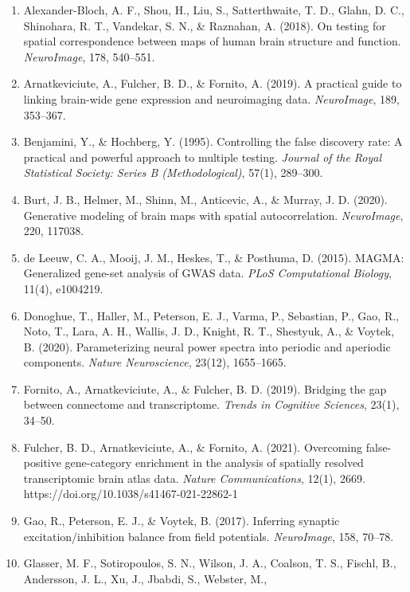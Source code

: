 \documentclass[
  11pt,
  letterpaper,
]{article}
\providecommand{\tightlist}{%
  \setlength{\itemsep}{0pt}\setlength{\parskip}{0pt}}
\begin{document}
\begin{enumerate}
\def\labelenumi{\arabic{enumi}.}
\tightlist
\item
  Alexander-Bloch, A. F., Shou, H., Liu, S., Satterthwaite, T. D.,
  Glahn, D. C., Shinohara, R. T., Vandekar, S. N., \& Raznahan, A.
  (2018). On testing for spatial correspondence between maps of human
  brain structure and function. \emph{NeuroImage}, 178, 540--551.
\item
  Arnatkeviciute, A., Fulcher, B. D., \& Fornito, A. (2019). A practical
  guide to linking brain-wide gene expression and neuroimaging data.
  \emph{NeuroImage}, 189, 353--367.
\item
  Benjamini, Y., \& Hochberg, Y. (1995). Controlling the false discovery
  rate: A practical and powerful approach to multiple testing.
  \emph{Journal of the Royal Statistical Society: Series B
  (Methodological)}, 57(1), 289--300.
\item
  Burt, J. B., Helmer, M., Shinn, M., Anticevic, A., \& Murray, J. D.
  (2020). Generative modeling of brain maps with spatial
  autocorrelation. \emph{NeuroImage}, 220, 117038.
\item
  de Leeuw, C. A., Mooij, J. M., Heskes, T., \& Posthuma, D. (2015).
  MAGMA: Generalized gene-set analysis of GWAS data. \emph{PLoS
  Computational Biology}, 11(4), e1004219.
\item
  Donoghue, T., Haller, M., Peterson, E. J., Varma, P., Sebastian, P.,
  Gao, R., Noto, T., Lara, A. H., Wallis, J. D., Knight, R. T.,
  Shestyuk, A., \& Voytek, B. (2020). Parameterizing neural power
  spectra into periodic and aperiodic components. \emph{Nature
  Neuroscience}, 23(12), 1655--1665.
\item
  Fornito, A., Arnatkeviciute, A., \& Fulcher, B. D. (2019). Bridging
  the gap between connectome and transcriptome. \emph{Trends in
  Cognitive Sciences}, 23(1), 34--50.
\item
  Fulcher, B. D., Arnatkeviciute, A., \& Fornito, A. (2021). Overcoming
  false-positive gene-category enrichment in the analysis of spatially
  resolved transcriptomic brain atlas data. \emph{Nature
  Communications}, 12(1), 2669.
  https://doi.org/10.1038/s41467-021-22862-1
\item
  Gao, R., Peterson, E. J., \& Voytek, B. (2017). Inferring synaptic
  excitation/inhibition balance from field potentials.
  \emph{NeuroImage}, 158, 70--78.
\item
  Glasser, M. F., Sotiropoulos, S. N., Wilson, J. A., Coalson, T. S.,
  Fischl, B., Andersson, J. L., Xu, J., Jbabdi, S., Webster, M.,

\end{enumerate}
\end{document}
